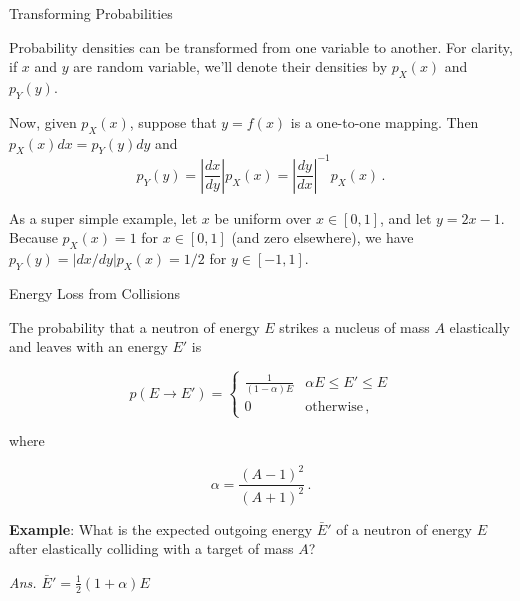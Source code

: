 \documentclass[aspectratio=1610]{beamer}
\let\oldfootnotesize\footnotesize
\renewcommand*{\footnotesize}{\oldfootnotesize\tiny}
\begin{document}
\begin{frame}{Transforming Probabilities}

Probability densities can be transformed from one variable to another.
For clarity, if $x$ and $y$ are random variable, we'll denote 
their densities by $p_X(x)$ and $p_Y(y)$.

\vfill 

Now, given $p_X(x)$, suppose that $y = f(x)$ is 
a one-to-one mapping. Then $p_X(x)dx = p_Y(y)dy$ and
\begin{equation*}
 p_Y(y) = \left | \frac{dx}{dy} \right | p_X(x) = \left | \frac{dy}{dx} \right |^{-1} p_X(x) \, .
\end{equation*}

\vfill

As a super simple example, let $x$ be uniform over $x \in [0, 1]$, and let $y = 2x-1$.  
Because $p_X(x) = 1$ for $x\in [0, 1]$ (and zero elsewhere), we have 
$p_Y(y) = |dx/dy|p_X(x) = 1/2$ for $y\in [-1, 1]$.
\end{frame}

\begin{frame}{Energy Loss from Collisions}

The probability that a neutron of energy \(E\) strikes a nucleus of mass
\(A\) elastically and leaves with an energy \(E'\) is

\[
p(E\to E') = 
  \begin{cases}
    \frac{1}{(1-\alpha)E} & \alpha E \leq E' \leq E \\
    0 & \text{otherwise} \, ,
  \end{cases}
\tag{FNRP 2.47}
\]

where

\[
 \alpha = \frac{(A-1)^2}{(A+1)^2} \, .
 \tag{FRNP 2.48}
\]



\pause 


{\bf Example}:  What is the expected outgoing energy $\bar{E}'$ of a neutron 
of energy $E$ after elastically colliding with a target of mass $A$?

\pause 
 
{\it\footnotesize Ans. $\bar{E}' = \frac{1}{2}(1+\alpha)E$}


\end{frame}
\end{document}

